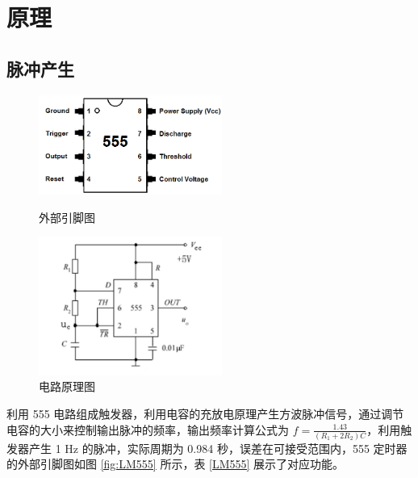 \section{原理}

\subsection{脉冲产生}

\begin{figure}[htbp]
	\centering
	\begin{minipage}[t]{0.48\textwidth}
		\centering
		\includegraphics[width=6cm]{figure/LM555.png}
		\caption{外部引脚图}\label{fig:LM555}
	\end{minipage}
	\begin{minipage}[t]{0.48\textwidth}
		\centering
		\includegraphics[width=6cm]{figure/LM555_circuit.png}
		\caption{电路原理图}\label{fig:LM555 circuit}
	\end{minipage}
\end{figure}

利用 555 电路组成触发器，利用电容的充放电原理产生方波脉冲信号，通过调节电容的大小来控制输出脉冲的频率，输出频率计算公式为 $f=\frac{1.43}{(R_1+2R_2)C}$，利用触发器产生 1 Hz 的脉冲，实际周期为 0.984 秒，误差在可接受范围内，555 定时器的外部引脚图如图 \ref{fig:LM555} 所示，表 \ref{LM555} 展示了对应功能。


